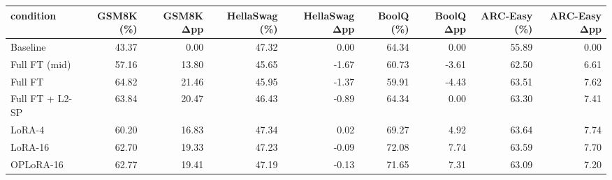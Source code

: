 \begin{tabular}{lrrrrrrrr}
\toprule
condition & GSM8K (\%) & GSM8K Δpp & HellaSwag (\%) & HellaSwag Δpp & BoolQ (\%) & BoolQ Δpp & ARC-Easy (\%) & ARC-Easy Δpp \\
\midrule
Baseline & 43.37 & 0.00 & 47.32 & 0.00 & 64.34 & 0.00 & 55.89 & 0.00 \\
Full FT (mid) & 57.16 & 13.80 & 45.65 & -1.67 & 60.73 & -3.61 & 62.50 & 6.61 \\
Full FT & 64.82 & 21.46 & 45.95 & -1.37 & 59.91 & -4.43 & 63.51 & 7.62 \\
Full FT + L2-SP & 63.84 & 20.47 & 46.43 & -0.89 & 64.34 & 0.00 & 63.30 & 7.41 \\
LoRA-4 & 60.20 & 16.83 & 47.34 & 0.02 & 69.27 & 4.92 & 63.64 & 7.74 \\
LoRA-16 & 62.70 & 19.33 & 47.23 & -0.09 & 72.08 & 7.74 & 63.59 & 7.70 \\
OPLoRA-16 & 62.77 & 19.41 & 47.19 & -0.13 & 71.65 & 7.31 & 63.09 & 7.20 \\
\bottomrule
\end{tabular}
